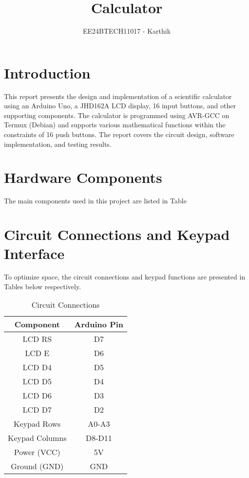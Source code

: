 \documentclass[journal]{IEEEtran}
\renewcommand{\thetable}{\arabic{table}}
\begin{document}

\vspace{3cm}
\title{Calculator}
\author{EE24BTECH11017 - Karthik}
{\let\newpage\relax\maketitle}
\renewcommand{\thefigure}{\theenumi}
\renewcommand{\thetable}{\theenumi}

\section{Introduction}
This report presents the design and implementation of a scientific calculator using an Arduino Uno, a JHD162A LCD display, 16 input buttons, and other supporting components. The calculator is programmed using AVR-GCC on Termux (Debian) and supports various mathematical functions within the constraints of 16 push buttons. The report covers the circuit design, software implementation, and testing results.



\section{Hardware Components}
The main components used in this project are listed in Table 


\section{Circuit Connections and Keypad Interface}
To optimize space, the circuit connections and keypad functions are presented in Tables below respectively.

\begin{table}[h!]
\centering
\small
\begin{tabular}{|c|c|}
\hline
\textbf{Component} & \textbf{Arduino Pin} \\
\hline
LCD RS & D7 \\
\hline
LCD E & D6 \\
\hline
LCD D4 & D5 \\
\hline
LCD D5 & D4 \\
\hline
LCD D6 & D3 \\
\hline
LCD D7 & D2 \\
\hline
Keypad Rows & A0-A3 \\
\hline
Keypad Columns & D8-D11 \\
\hline
Power (VCC) & 5V \\
\hline
Ground (GND) & GND \\
\hline
\end{tabular}
\caption{Circuit Connections}
\label{tab:connections}
\end{table}
\end{document}
